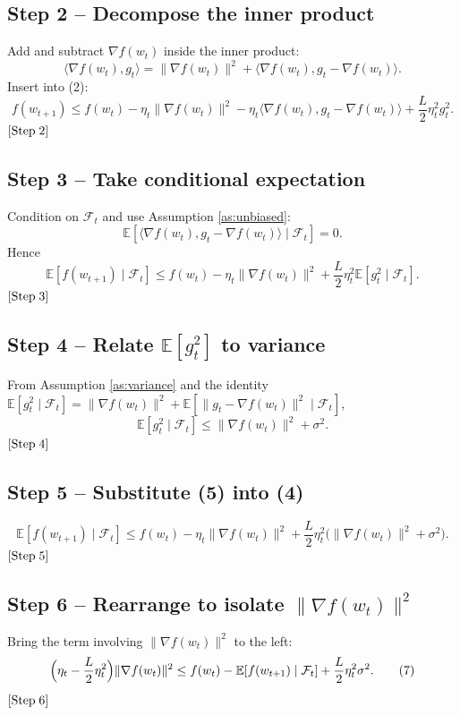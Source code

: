 \documentclass{article}
\newcommand{\E}{\mathbb{E}}
\begin{document}
\subsection*{Step 2 – Decompose the inner product}
Add and subtract $\nabla f(w_{t})$ inside the inner product:
\[
\langle\nabla f(w_{t}),g_{t}\rangle
= \|\nabla f(w_{t})\|^{2}
  +\langle\nabla f(w_{t}),g_{t}-\nabla f(w_{t})\rangle .
\]
Insert into (2):
\[
f(w_{t+1})\le f(w_{t})
    -\eta_{t}\|\nabla f(w_{t})\|^{2}
    -\eta_{t}\langle\nabla f(w_{t}),g_{t}-\nabla f(w_{t})\rangle
    +\frac{L}{2}\eta_{t}^{2}g_{t}^{2}.                         \tag{3}
\]
\([{\rm Step}\;2]\)

\subsection*{Step 3 – Take conditional expectation}
Condition on $\mathcal{F}_{t}$ and use Assumption \ref{as:unbiased}:
\[
\E\!\left[\langle\nabla f(w_{t}),g_{t}-\nabla f(w_{t})\rangle\mid\mathcal{F}_{t}\right]=0.
\]
Hence
\[
\E\!\left[f(w_{t+1})\mid\mathcal{F}_{t}\right]
\le f(w_{t})-\eta_{t}\|\nabla f(w_{t})\|^{2}
    +\frac{L}{2}\eta_{t}^{2}\E\!\left[g_{t}^{2}\mid\mathcal{F}_{t}\right].
\tag{4}
\]
\([{\rm Step}\;3]\)

\subsection*{Step 4 – Relate $\E[g_{t}^{2}]$ to variance}
From Assumption \ref{as:variance} and the identity
\(\E[g_{t}^{2}\mid\mathcal{F}_{t}]
    =\|\nabla f(w_{t})\|^{2}+\E[\|g_{t}-\nabla f(w_{t})\|^{2}\mid\mathcal{F}_{t}]\),
\[
\E[g_{t}^{2}\mid\mathcal{F}_{t}]
\le \|\nabla f(w_{t})\|^{2}+\sigma^{2}.                         \tag{5}
\]
\([{\rm Step}\;4]\)

\subsection*{Step 5 – Substitute (5) into (4)}
\[
\E\!\left[f(w_{t+1})\mid\mathcal{F}_{t}\right]
\le f(w_{t})-\eta_{t}\|\nabla f(w_{t})\|^{2}
    +\frac{L}{2}\eta_{t}^{2}\bigl(\|\nabla f(w_{t})\|^{2}+\sigma^{2}\bigr).
\tag{6}
\]
\([{\rm Step}\;5]\)

\subsection*{Step 6 – Rearrange to isolate $\|\nabla f(w_{t})\|^{2}$}
Bring the term involving $\|\nabla f(w_{t})\|^{2}$ to the left:
\[
\Bigl(\eta_{t}-\frac{L}{2}\eta_{t}^{2}\Bigr)\|\nabla f(w_{t})\|^{2}
\le f(w_{t})-\E\!\left[f(w_{t+1})\mid\mathcal{F}_{t}\right]
    +\frac{L}{2}\eta_{t}^{2}\sigma^{2}.                         \tag{7}
\]
\([{\rm Step}\;6]\)
\end{document}
